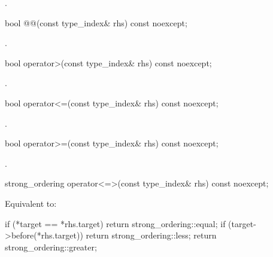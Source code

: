 \begin{itemdescr}
\pnum
\returns
{}.
\end{itemdescr}

%
\begin{itemdecl}
bool @@(const type_index& rhs) const noexcept;
\end{itemdecl}

\begin{itemdescr}
\pnum
\returns
{}.
\end{itemdescr}

%
\begin{itemdecl}
bool operator>(const type_index& rhs) const noexcept;
\end{itemdecl}

\begin{itemdescr}
\pnum
\returns
{}.
\end{itemdescr}

%
\begin{itemdecl}
bool operator<=(const type_index& rhs) const noexcept;
\end{itemdecl}

\begin{itemdescr}
\pnum
\returns
{}.
\end{itemdescr}

%
\begin{itemdecl}
bool operator>=(const type_index& rhs) const noexcept;
\end{itemdecl}

\begin{itemdescr}
\pnum
\returns
{}.
\end{itemdescr}

%
\begin{itemdecl}
strong_ordering operator<=>(const type_index& rhs) const noexcept;
\end{itemdecl}

\begin{itemdescr}
\pnum
\effects
Equivalent to:
\begin{codeblock}
if (*target == *rhs.target) return strong_ordering::equal;
if (target->before(*rhs.target)) return strong_ordering::less;
return strong_ordering::greater;
\end{codeblock}
\end{itemdescr}

